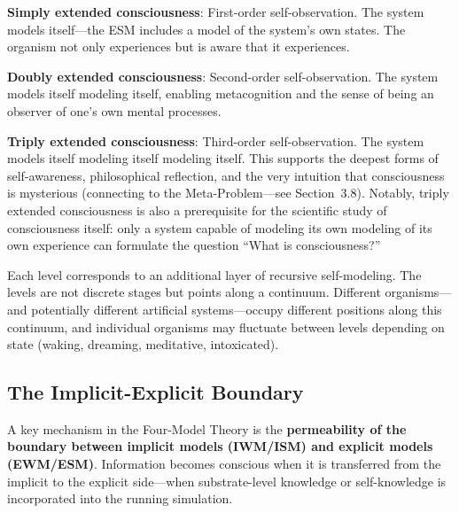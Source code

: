 \documentclass[12pt]{article}
\begin{document}
\textbf{Simply extended consciousness}: First-order self-observation. The system models itself---\hspace{0pt}the ESM includes a model of the system's own states. The organism not only experiences but is aware that it experiences.

\textbf{Doubly extended consciousness}: Second-order self-observation. The system models itself modeling itself, enabling metacognition and the sense of being an observer of one's own mental processes.

\textbf{Triply extended consciousness}: Third-order self-observation. The system models itself modeling itself modeling itself. This supports the deepest forms of self-awareness, philosophical reflection, and the very intuition that consciousness is mysterious (connecting to the Meta-Problem---\hspace{0pt}see Section~3.8). Notably, triply extended consciousness is also a prerequisite for the scientific study of consciousness itself: only a system capable of modeling its own modeling of its own experience can formulate the question ``What is consciousness?''

Each level corresponds to an additional layer of recursive self-modeling. The levels are not discrete stages but points along a continuum. Different organisms---\hspace{0pt}and potentially different artificial systems---\hspace{0pt}occupy different positions along this continuum, and individual organisms may fluctuate between levels depending on state (waking, dreaming, meditative, intoxicated).


\subsection{The Implicit-Explicit Boundary}

A key mechanism in the Four-Model Theory is the \textbf{permeability of the boundary between implicit models (IWM/ISM) and explicit models (EWM/ESM)}. Information becomes conscious when it is transferred from the implicit to the explicit side---\hspace{0pt}when substrate-level knowledge or self-knowledge is incorporated into the running simulation.
\end{document}
